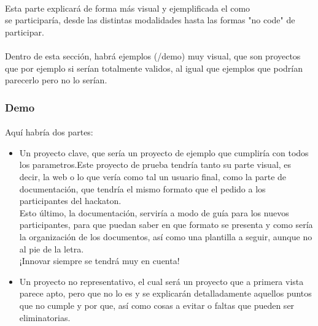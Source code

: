 \documentclass[a4paper]{article}
\begin{document}
    \paragraph{}
    Esta parte explicará de forma más visual y ejemplificada el como\\ se participaría, 
    desde las distintas modalidades hasta las formas "no code" de participar.
    \paragraph{}
    Dentro de esta sección, habrá ejemplos (/demo) muy visual, que son proyectos que por ejemplo 
    si serían totalmente validos, al igual que ejemplos que podrían parecerlo pero no lo serían.
    \subsubsection[/demo]{Demo}
    \paragraph{}
    Aquí habría dos partes: 
    \begin{itemize}
        \item 
        Un proyecto clave, que sería un proyecto de ejemplo que cumpliría con 
        todos los parametros.Este proyecto de prueba tendría tanto su parte visual, es decir, 
        la web o lo que vería como tal un usuario final, como la parte de documentación, 
        que tendría el mismo formato que el pedido a los participantes del hackaton.\\
        Esto último, la documentación, serviría a modo de guía para los nuevos participantes, 
        para que puedan saber en que formato se presenta y como sería la organización de los 
        documentos, así como una plantilla a seguir, aunque no al pie de la letra.\\
        ¡Innovar siempre se tendrá muy en cuenta!
        \item Un proyecto no representativo, el cual 
        será un proyecto que a primera vista parece apto, pero que no lo es y 
        se explicarán detalladamente aquellos puntos que no cumple y por que, así como
        cosas a evitar o faltas que pueden ser eliminatorias.
    \end{itemize}
\end{document}
